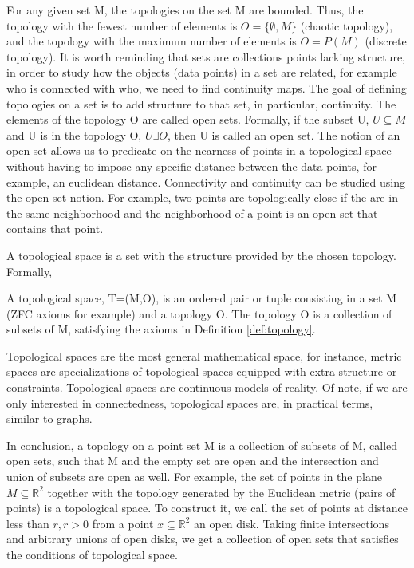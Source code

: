 \documentclass[onecollarge,runningheads]{svjour2}
\begin{document}
For any given set M, the topologies on the set M are bounded. Thus, the topology with the fewest number of elements is $O = \{\emptyset, M\}$ (chaotic topology), and the topology with the maximum number of elements is $O = P(M)$ (discrete topology). It is worth reminding that sets are collections points lacking structure, in order to study how the objects (data points) in a set are related, for example who is connected with who, we need to find continuity maps. The goal of defining topologies on a set is to add structure to that set, in particular, continuity.
The elements of the topology O are called open sets. Formally, if the subset U, $U \subseteq M$ and U is in the topology O, $U \exists O$, then U is called an open set. 
The notion of an open set allows us to predicate on the nearness of points in a topological space without having to impose any specific distance between the data points, for example, an euclidean distance. 
Connectivity and continuity can be studied using the open set notion. For example, two points are topologically close if the are in the same neighborhood and the neighborhood of a point is an open set that contains that point. 

A topological space is a set with the structure provided by the chosen topology. Formally,
\begin{definition}
A topological space, T=(M,O), is an ordered pair or tuple consisting in a set M (ZFC axioms for example) and a topology O. The topology O is a collection of subsets of M, satisfying the axioms in Definition \ref{def:topology}.
 \end{definition}
Topological spaces are the most general mathematical space, for instance, metric spaces are specializations of topological spaces equipped with extra structure or constraints. 
Topological spaces are continuous models of reality. Of note, if we are only interested in connectedness, topological spaces are, in practical terms, similar to graphs.  
 
In conclusion, a topology on a point set M is a collection of subsets of M, called open sets, such that M and the empty set are open and the intersection and union of subsets are open as well. For example, the set of points in the plane $M \subseteq \mathbb{R}^2$ together with the topology generated by the Euclidean metric (pairs of points) is a topological space. To construct it, we call the set of points at distance less than $r, r > 0$ from a point $x \subseteq \mathbb{R}^2$ an open disk. Taking finite intersections and arbitrary unions of open disks, we get a collection of open sets that satisfies the conditions of topological space. 
\end{document}
